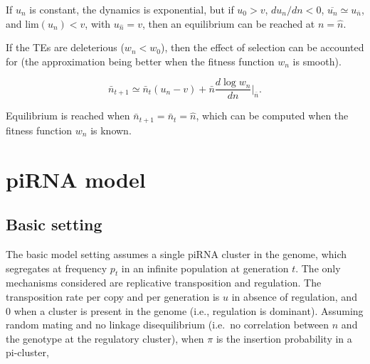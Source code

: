\documentclass[10pt,a4paper]{article}
\begin{document}
If $u_n$ is constant, the dynamics is exponential, but if $u_0 > v$, $d u_n / d n < 0$, $\overline{u_n} \simeq u_{\bar n}$, and $\mathrm{lim} (u_n) < v$, with $u_{\hat n} = v$, then an equilibrium can be reached at $n = \hat n$. 

If the TEs are deleterious ($w_n < w_0$), then the effect of selection can be accounted for (the approximation being better when the fitness function $w_n$ is smooth). 

\begin{equation}\label{eq:cc2}
\bar n_{t+1} \simeq \bar n_t(u_n - v) + \bar n \frac{d \log w_n}{d n} \Bigr|_{\bar n}.
\end{equation}

Equilibrium is reached when $\bar n_{t+1} = \bar n_t = \hat n$, which can be computed when the fitness function $w_n$ is known. 



\section{piRNA model}

\subsection{Basic setting} 

The basic model setting assumes a single piRNA cluster in the genome, which segregates at frequency $p_t$ in an infinite population at generation $t$. The only mechanisms considered are replicative transposition and regulation. The transposition rate per copy and per generation is $u$ in absence of regulation, and $0$ when a cluster is present in the genome (i.e., regulation is dominant). Assuming random mating and no linkage disequilibrium (i.e.\ no correlation between $n$ and the genotype at the regulatory cluster), when $\pi$ is the insertion probability in a pi-cluster,
\end{document}
